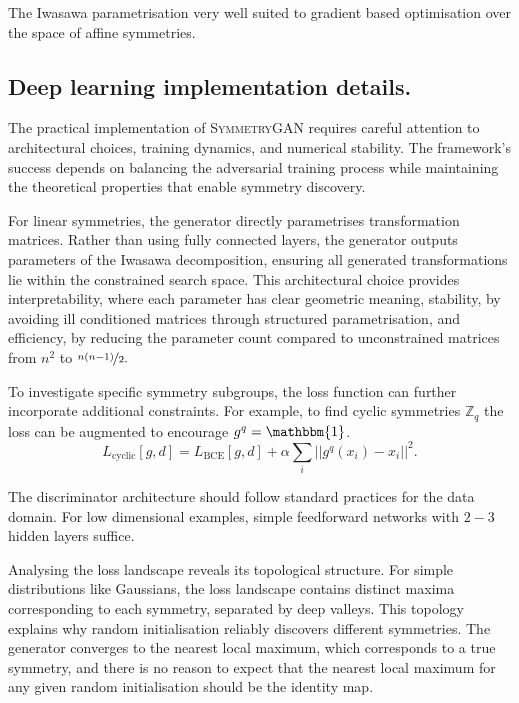 The Iwasawa parametrisation very well suited to gradient based optimisation over the space of affine symmetries.

\subsection{Deep learning implementation details.}

    The practical implementation of \textsc{SymmetryGAN} requires careful attention to architectural choices, training dynamics, and numerical stability.
    The framework's success depends on balancing the adversarial training process while maintaining the theoretical properties that enable symmetry discovery.
    
    For linear symmetries, the generator directly parametrises transformation matrices.
    Rather than using fully connected layers, the generator outputs parameters of the Iwasawa decomposition, ensuring all generated transformations lie within the constrained search space.
    This architectural choice provides interpretability, where each parameter has clear geometric meaning, stability, by avoiding ill conditioned matrices through structured parametrisation, and efficiency, by reducing the parameter count compared to unconstrained matrices from \(n^2\) to \(\nicefrac{n(n-1)}{2}.\)

    To investigate specific symmetry subgroups, the loss function can further incorporate additional constraints.
    For example, to find cyclic symmetries \(\mathbb{Z}_q\) the loss can be augmented to encourage \(g^q = \mathbbm{1}\).
    \[
        \label{eq:cyclic-loss}
        L_{\text{cyclic}}[g,d] = L_{\text{BCE}}[g,d] + \alpha \sum_{i} ||g^q(x_i) - x_i||^2.
    \]

    The discriminator architecture should follow standard practices for the data domain.
    For low dimensional examples, simple feedforward networks with \(2-3\) hidden layers suffice.

    Analysing the loss landscape reveals its topological structure.
    For simple distributions like Gaussians, the loss landscape contains distinct maxima corresponding to each symmetry, separated by deep valleys.
    This topology explains why random initialisation reliably discovers different symmetries.
    The generator converges to the nearest local maximum, which corresponds to a true symmetry, and there is no reason to expect that the nearest local maximum for any given random initialisation should be the identity map.


